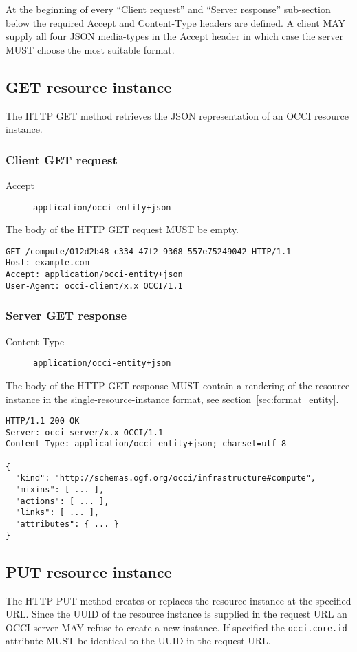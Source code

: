 \documentclass[10pt,a4paper]{article}
\begin{document}
At the beginning of every ``Client request'' and ``Server response''
sub-section below the required Accept and Content-Type headers are defined. A
client MAY supply all four JSON media-types in the Accept header in which case
the server MUST choose the most suitable format.

\subsection{GET resource instance}
The HTTP GET method retrieves the JSON representation of an OCCI resource
instance.

\subsubsection{Client GET request}
\begin{description}
\item[Accept] {\tt application/occi-entity+json}
\end{description}
The body of the HTTP GET request MUST be empty.
\begin{verbatim}
GET /compute/012d2b48-c334-47f2-9368-557e75249042 HTTP/1.1
Host: example.com
Accept: application/occi-entity+json
User-Agent: occi-client/x.x OCCI/1.1
\end{verbatim}

\subsubsection{Server GET response}
\begin{description}
\item[Content-Type] {\tt application/occi-entity+json}
\end{description}
The body of the HTTP GET response MUST contain a rendering of the resource
instance in the single-resource-instance format, see
section~\ref{sec:format_entity}.
\begin{verbatim}
HTTP/1.1 200 OK
Server: occi-server/x.x OCCI/1.1
Content-Type: application/occi-entity+json; charset=utf-8

{
  "kind": "http://schemas.ogf.org/occi/infrastructure#compute",
  "mixins": [ ... ],
  "actions": [ ... ],
  "links": [ ... ],
  "attributes": { ... }
}
\end{verbatim}

\subsection{PUT resource instance}
The HTTP PUT method creates or replaces the resource instance at the specified
URL. Since the UUID of the resource instance is supplied in the request URL an OCCI
server MAY refuse to create a new instance.
If specified the {\tt occi.core.id} attribute MUST be identical to the UUID in
the request URL.
\end{document}
